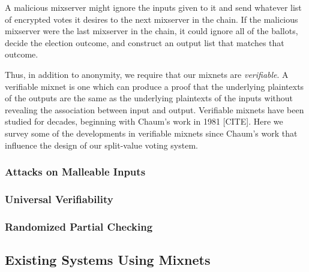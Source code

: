 A malicious mixserver might ignore the inputs given to it and send whatever list of encrypted votes it desires to the next mixserver in the chain. If the malicious mixserver were the last mixserver in the chain, it could ignore all of the ballots, decide the election outcome, and construct an output list that matches that outcome.

Thus, in addition to anonymity, we require that our mixnets are \emph{verifiable}. A verifiable mixnet is one which can produce a proof that the underlying plaintexts of the outputs are the same as the underlying plaintexts of the inputs without revealing the association between input and output. Verifiable mixnets have been studied for decades, beginning with Chaum's work in 1981 [CITE]. Here we survey some of the developments in verifiable mixnets since Chaum's work that influence the design of our split-value voting system.

\subsubsection{Attacks on Malleable Inputs}

\subsubsection{Universal Verifiability}

\subsubsection{Randomized Partial Checking}

\subsection{Existing Systems Using Mixnets}






